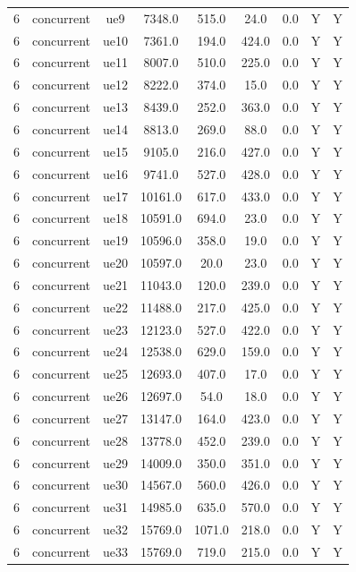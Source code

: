 \begin{table}[ht]
\begin{tabular}{|c|c|c|c|c|c|c|c|c|}
6 & concurrent & ue9 & 7348.0 & 515.0 & 24.0 & 0.0 & Y & Y \\
6 & concurrent & ue10 & 7361.0 & 194.0 & 424.0 & 0.0 & Y & Y \\
6 & concurrent & ue11 & 8007.0 & 510.0 & 225.0 & 0.0 & Y & Y \\
6 & concurrent & ue12 & 8222.0 & 374.0 & 15.0 & 0.0 & Y & Y \\
6 & concurrent & ue13 & 8439.0 & 252.0 & 363.0 & 0.0 & Y & Y \\
6 & concurrent & ue14 & 8813.0 & 269.0 & 88.0 & 0.0 & Y & Y \\
6 & concurrent & ue15 & 9105.0 & 216.0 & 427.0 & 0.0 & Y & Y \\
6 & concurrent & ue16 & 9741.0 & 527.0 & 428.0 & 0.0 & Y & Y \\
6 & concurrent & ue17 & 10161.0 & 617.0 & 433.0 & 0.0 & Y & Y \\
6 & concurrent & ue18 & 10591.0 & 694.0 & 23.0 & 0.0 & Y & Y \\
6 & concurrent & ue19 & 10596.0 & 358.0 & 19.0 & 0.0 & Y & Y \\
6 & concurrent & ue20 & 10597.0 & 20.0 & 23.0 & 0.0 & Y & Y \\
6 & concurrent & ue21 & 11043.0 & 120.0 & 239.0 & 0.0 & Y & Y \\
6 & concurrent & ue22 & 11488.0 & 217.0 & 425.0 & 0.0 & Y & Y \\
6 & concurrent & ue23 & 12123.0 & 527.0 & 422.0 & 0.0 & Y & Y \\
6 & concurrent & ue24 & 12538.0 & 629.0 & 159.0 & 0.0 & Y & Y \\
6 & concurrent & ue25 & 12693.0 & 407.0 & 17.0 & 0.0 & Y & Y \\
6 & concurrent & ue26 & 12697.0 & 54.0 & 18.0 & 0.0 & Y & Y \\
6 & concurrent & ue27 & 13147.0 & 164.0 & 423.0 & 0.0 & Y & Y \\
6 & concurrent & ue28 & 13778.0 & 452.0 & 239.0 & 0.0 & Y & Y \\
6 & concurrent & ue29 & 14009.0 & 350.0 & 351.0 & 0.0 & Y & Y \\
6 & concurrent & ue30 & 14567.0 & 560.0 & 426.0 & 0.0 & Y & Y \\
6 & concurrent & ue31 & 14985.0 & 635.0 & 570.0 & 0.0 & Y & Y \\
6 & concurrent & ue32 & 15769.0 & 1071.0 & 218.0 & 0.0 & Y & Y \\
6 & concurrent & ue33 & 15769.0 & 719.0 & 215.0 & 0.0 & Y & Y \\

\end{tabular}
\end{table}
